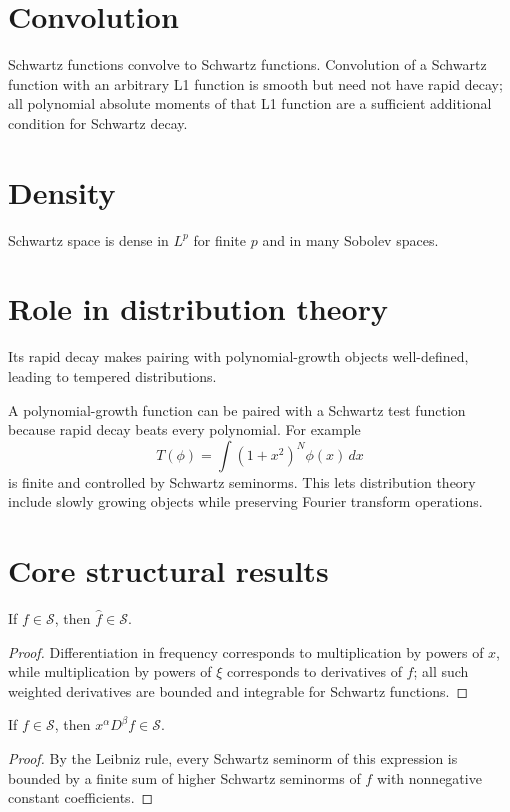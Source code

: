 \section{Convolution}
Schwartz functions convolve to Schwartz functions. Convolution of a Schwartz function with an arbitrary L1 function is smooth but need not have rapid decay; all polynomial absolute moments of that L1 function are a sufficient additional condition for Schwartz decay.

\section{Density}
Schwartz space is dense in $L^p$ for finite $p$ and in many Sobolev spaces.

\section{Role in distribution theory}
Its rapid decay makes pairing with polynomial-growth objects well-defined, leading to tempered distributions.


\begin{example}\label{ex:iii14-expand-03}
A polynomial-growth function can be paired with a Schwartz test function because
rapid decay beats every polynomial. For example
\[
T(\phi)=\int(1+x^2)^N\phi(x)\,dx
\]
is finite and controlled by Schwartz seminorms. This lets distribution theory
include slowly growing objects while preserving Fourier transform operations.
\end{example}
\section{Core structural results}

\begin{theorem}\label{thm:iii14-01}
If $f\in\mathcal S$, then $\widehat f\in\mathcal S$.
\begin{proof}
Differentiation in frequency corresponds to multiplication by powers of $x$, while multiplication by powers of $\xi$ corresponds to derivatives of $f$; all such weighted derivatives are bounded and integrable for Schwartz functions.
\end{proof}
\end{theorem}

\begin{theorem}\label{thm:iii14-02}
If $f\in\mathcal S$, then $x^\alpha D^\beta f\in\mathcal S$.
\begin{proof}
By the Leibniz rule, every Schwartz seminorm of this expression is bounded by a finite sum of higher Schwartz seminorms of $f$ with nonnegative constant coefficients.
\end{proof}
\end{theorem}

